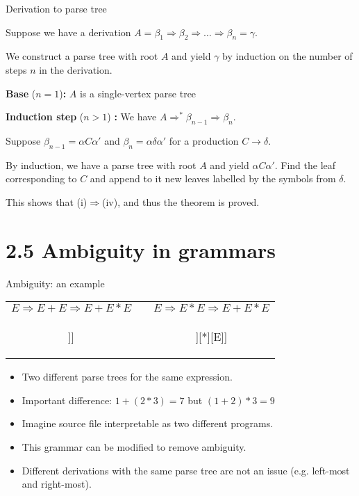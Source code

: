 \documentclass[handout]{beamer}
\begin{document}
\begin{frame}{Derivation to parse tree}

	Suppose we have a derivation $A=\beta_1\Rightarrow\beta_2\Rightarrow\dots\Rightarrow\beta_n=\gamma$. 
	
	We construct a parse tree with root $A$ and yield $\gamma$ by induction on the number of steps $n$ in the derivation.

	\textbf{Base} ($n=1$)\textbf{:} $A$ is a single-vertex parse tree

	\textbf{Induction step} ($n>1$) \textbf{:} We have $A\Rightarrow^*\beta_{n-1}\Rightarrow\beta_n$. 
	
	Suppose $\beta_{n-1}=\alpha C\alpha'$ and $\beta_n=\alpha\delta\alpha'$ for a production $C\to\delta$.


	By induction, we have a parse tree with root $A$ and yield $\alpha C\alpha'$. Find the leaf corresponding to $C$ and append to it new leaves labelled by the symbols from $\delta$.
	
	\bigskip

	This shows that (i)$\Rightarrow$(iv), and thus the theorem is proved. \hfill\qedsymbol
	
\end{frame}


\section{2.5 Ambiguity in grammars}


\begin{frame}{Ambiguity: an example}	

	\bigskip
	\begin{tabular}{c c c}
		$E\Rightarrow E+E\Rightarrow E+E*E$ & \hspace{1em} &
		$E\Rightarrow E*E\Rightarrow E+E*E$ \\
		\begin{forest} 
		[E [E][+][E[E][*][E]]]
		\end{forest}
		& &
		\begin{forest} 
		[E[E[E][+][E]][*][E]]
		\end{forest}
	\end{tabular}
	\begin{itemize}
		\item \alert{Two different parse trees for the same expression.}
		\item Important difference: $1+(2*3)=7 $ but $(1+2)*3=9$
		\item Imagine source file interpretable as two different programs.
		\item This grammar can be modified to remove ambiguity.
		\item Different derivations with the same parse tree are not an issue (e.g. left-most and right-most).
	\end{itemize}

\end{frame}
\end{document}
